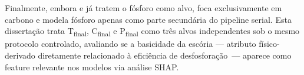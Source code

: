Finalmente, embora \citeauthor{bae2020bof} e \citeauthor{zhou2024bof} já tratem o fósforo como alvo, \citeauthor{xia2024dmpinn} foca exclusivamente em carbono e \citeauthor{chattopadhyay2022hybrid} modela fósforo apenas como parte secundária do pipeline serial. Esta dissertação trata T\textsubscript{final}, C\textsubscript{final} e P\textsubscript{final} como três alvos independentes sob o mesmo protocolo controlado, avaliando se a basicidade da escória — atributo físico-derivado diretamente relacionado à eficiência de desfosforação\,\cite{bae2020bof} — aparece como feature relevante nos modelos via análise SHAP.
